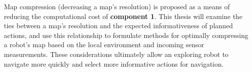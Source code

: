 



Map compression (decreasing a map's resolution) is proposed as a means of reducing the computational cost of
{\bf component 1}. This thesis will examine the ties between a map's resolution
and the expected informativeness of planned actions, and use this relationship to formulate
methods for optimally compressing a robot's map based on the local environment
and incoming sensor measurements. These considerations ultimately allow an
exploring robot to navigate more quickly and select more
informative actions for navigation.


